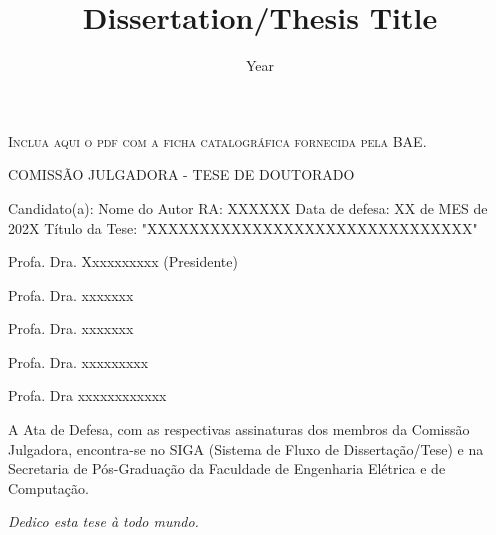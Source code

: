 \documentclass[12pt,oneside,a4paper,english]{abntex2}
\date{Year}
\title{Dissertation/Thesis Title}
\renewcommand\maketitle{}
\begin{document}
\maketitle
{}
\imprimircapa
\imprimirfolhaderosto*

\begin{fichacatalografica}
    \vspace*{\fill}
    \begin{center}
        \textsc{Inclua aqui o pdf com a ficha catalográfica fornecida pela BAE.}
    \end{center}
    \vspace*{\fill}
\end{fichacatalografica}

\begin{folhadeaprovacao}
  \begin{center}
    COMISSÃO JULGADORA - TESE DE DOUTORADO
\end{center}
\noindent
\begin{minipage}{\textwidth}\SingleSpacing
Candidato(a): Nome do Autor      RA: XXXXXX
Data de defesa: XX de MES de 202X
Título da Tese: "XXXXXXXXXXXXXXXXXXXXXXXXXXXXXXX"
\vspace{2cm}

Profa. Dra. Xxxxxxxxxx (Presidente)

Profa. Dra. xxxxxxx

Profa. Dra. xxxxxxx

Profa. Dra. xxxxxxxxx

Profa. Dra xxxxxxxxxxxx

\vspace{2cm}

A Ata de Defesa, com as respectivas assinaturas dos membros da Comissão Julgadora, encontra-se no SIGA (Sistema de Fluxo de Dissertação/Tese) e na Secretaria de Pós-Graduação da Faculdade de Engenharia Elétrica e de Computação.
\end{minipage}

\end{folhadeaprovacao}

\begin{dedicatoria}
   \vspace*{\fill}
   \centering
   \noindent
   \textit{ Dedico esta tese à todo mundo.} \vspace*{\fill}
\end{dedicatoria}
\end{document}
